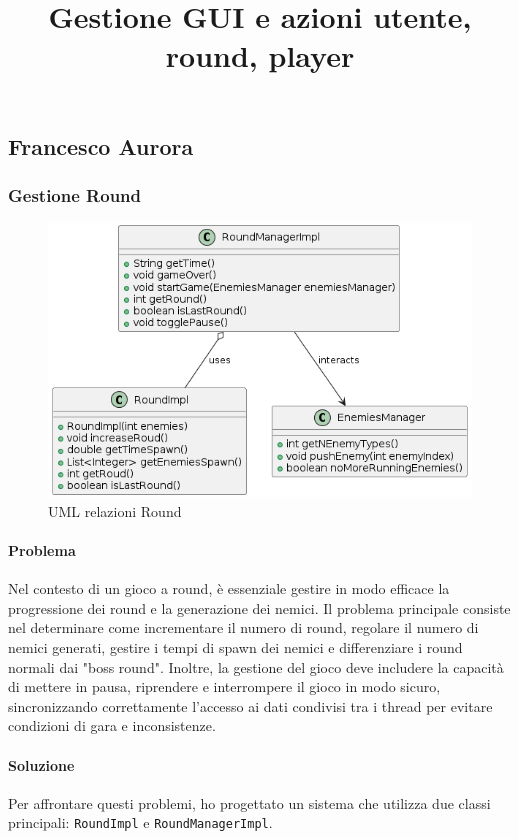\documentclass[a4paper,12pt]{report}
\begin{document}
\subsection{Francesco Aurora}
\title{\textbf{Gestione GUI e azioni utente, round, player}}
\subsubsection{Gestione Round}

\begin{figure}[H]
    \centering
    \includegraphics[scale=1]{Round}
    \caption{UML relazioni Round}
    \label{fig:round}
\end{figure}

\paragraph{Problema} Nel contesto di un gioco a round, è essenziale gestire in modo efficace la progressione dei round e la generazione dei nemici. Il problema principale consiste nel determinare come incrementare il numero di round, regolare il numero di nemici generati, gestire i tempi di spawn dei nemici e differenziare i round normali dai "boss round". Inoltre, la gestione del gioco deve includere la capacità di mettere in pausa, riprendere e interrompere il gioco in modo sicuro, sincronizzando correttamente l'accesso ai dati condivisi tra i thread per evitare condizioni di gara e inconsistenze.

\paragraph{Soluzione} Per affrontare questi problemi, ho progettato un sistema che utilizza due classi principali: \texttt{RoundImpl} e \texttt{RoundManagerImpl}.
\end{document}
